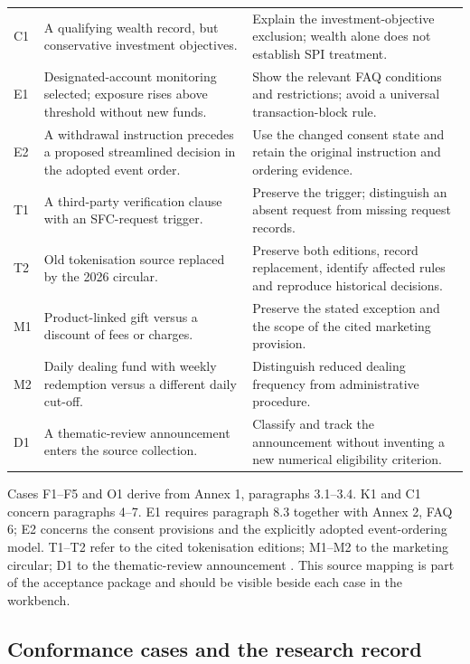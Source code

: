 \begin{longtable}{P{0.09\textwidth}P{0.41\textwidth}P{0.4\textwidth}}
C1 & A qualifying wealth record, but conservative investment objectives. & Explain
the investment-objective exclusion; wealth alone does not establish SPI treatment.\\
E1 & Designated-account monitoring selected; exposure rises above threshold without
new funds. & Show the relevant FAQ conditions and restrictions; avoid a universal
transaction-block rule.\\
E2 & A withdrawal instruction precedes a proposed streamlined decision in the
adopted event order. & Use the changed consent state and retain the original
instruction and ordering evidence.\\
T1 & A third-party verification clause with an SFC-request trigger. & Preserve the
trigger; distinguish an absent request from missing request records.\\
T2 & Old tokenisation source replaced by the 2026 circular. & Preserve both editions,
record replacement, identify affected rules and reproduce historical decisions.\\
M1 & Product-linked gift versus a discount of fees or charges. & Preserve the stated
exception and the scope of the cited marketing provision.\\
M2 & Daily dealing fund with weekly redemption versus a different daily cut-off. &
Distinguish reduced dealing frequency from administrative procedure.\\
D1 & A thematic-review announcement enters the source collection. & Classify and
track the announcement without inventing a new numerical eligibility criterion.\\
\bottomrule
\end{longtable}
\endgroup

Cases F1--F5 and O1 derive from Annex 1, paragraphs 3.1--3.4. K1 and C1 concern
paragraphs 4--7. E1 requires paragraph 8.3 together with Annex 2, FAQ 6; E2 concerns
the consent provisions and the explicitly adopted event-ordering model. T1--T2
refer to the cited tokenisation editions; M1--M2 to the marketing circular; D1
to the thematic-review announcement
\citep{sfcspiannex1,sfcspiannex2,sfctoken2023,sfctoken2026,sfcmarketing,sfcreview2025}.
This source mapping is part of the acceptance package and should be visible
beside each case in the workbench.

\subsection{Conformance cases and the research record}

